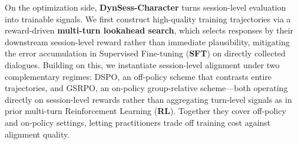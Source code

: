 
On the optimization side, \textbf{DynSess-Character} turns session-level evaluation into trainable signals. We first construct high-quality training trajectories via a reward-driven \textbf{multi-turn lookahead search}, which selects responses by their downstream session-level reward rather than immediate plausibility, mitigating the error accumulation in Supervised Fine-tuning (\textbf{SFT}) on directly collected dialogues. Building on this, we instantiate session-level alignment under two complementary regimes: DSPO, an off-policy scheme that contrasts entire trajectories, and GSRPO, an on-policy group-relative scheme—both operating directly on session-level rewards rather than aggregating turn-level signals as in prior multi-turn Reinforcement Learning (\textbf{RL}). Together they cover off-policy and on-policy settings, letting practitioners trade off training cost against alignment quality.


